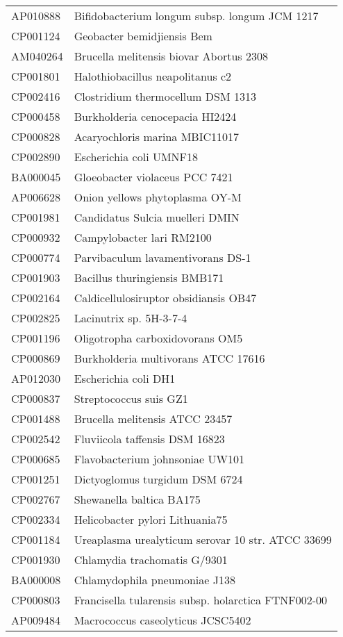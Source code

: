 \begin{longtable}{ll}
AP010888 & Bifidobacterium longum subsp. longum JCM 1217\\
CP001124 & Geobacter bemidjiensis Bem\\
AM040264 & Brucella melitensis biovar Abortus 2308\\
CP001801 & Halothiobacillus neapolitanus c2\\
CP002416 & Clostridium thermocellum DSM 1313\\
CP000458 & Burkholderia cenocepacia HI2424\\
CP000828 & Acaryochloris marina MBIC11017\\
CP002890 & Escherichia coli UMNF18\\
BA000045 & Gloeobacter violaceus PCC 7421\\
AP006628 & Onion yellows phytoplasma OY-M\\
CP001981 & Candidatus Sulcia muelleri DMIN\\
CP000932 & Campylobacter lari RM2100\\
CP000774 & Parvibaculum lavamentivorans DS-1\\
CP001903 & Bacillus thuringiensis BMB171\\
CP002164 & Caldicellulosiruptor obsidiansis OB47\\
CP002825 & Lacinutrix sp. 5H-3-7-4\\
CP001196 & Oligotropha carboxidovorans OM5\\
CP000869 & Burkholderia multivorans ATCC 17616\\
AP012030 & Escherichia coli DH1\\
CP000837 & Streptococcus suis GZ1\\
CP001488 & Brucella melitensis ATCC 23457\\
CP002542 & Fluviicola taffensis DSM 16823\\
CP000685 & Flavobacterium johnsoniae UW101\\
CP001251 & Dictyoglomus turgidum DSM 6724\\
CP002767 & Shewanella baltica BA175\\
CP002334 & Helicobacter pylori Lithuania75\\
CP001184 & Ureaplasma urealyticum serovar 10 str. ATCC 33699\\
CP001930 & Chlamydia trachomatis G/9301\\
BA000008 & Chlamydophila pneumoniae J138\\
CP000803 & Francisella tularensis subsp. holarctica FTNF002-00\\
AP009484 & Macrococcus caseolyticus JCSC5402\\

\end{longtable}
